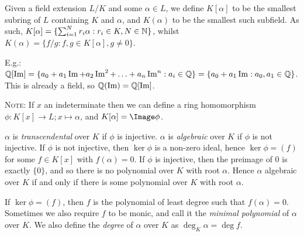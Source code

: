\documentclass[a4paper, 10pt, twocolumn]{amsart}
\begin{document}
Given a field extension $L/K$ and some $\alpha \in L$, we define $K[\alpha]$ to be the smallest subring of $L$ containing $K$ and $\alpha$, and $K(\alpha)$ to be the smallest such subfield. As such, $K[\alpha] = \{\sum_{i=1}^N r_i \alpha : r_i \in K, N \in \mathbb{N}\}$, whilst $K(\alpha) = \{f/g : f,g \in K[\alpha], g\neq 0\}$.

E.g.: $\mathbb{Q}[\operatorname{Im}] = \{a_0 + a_1\operatorname{Im} + a_2\operatorname{Im}^2 + \ldots + a_n\operatorname{Im}^n :a_i\in\mathbb{Q}\} = \{a_0 + a_1\operatorname{Im} : a_0, a_1 \in \mathbb{Q}\}$. This is already a field, so $\mathbb{Q}(\operatorname{Im}) = \mathbb{Q}[\operatorname{Im}]$.

\textsc{Note:} If $x$ an indeterminate then we can define a ring homomorphism $\phi:K[x] \rightarrow L; x\mapsto \alpha$, and $K[\alpha] = \Image \phi$.

$\alpha$ is \emph{transcendental} over $K$ if $\phi$ is injective. $\alpha$ is \emph{algebraic} over $K$ if $\phi$ is not injective. If $\phi$ is not injective, then $\ker\phi$ is a non-zero ideal, hence $\ker\phi = (f)$ for some $f\in K[x]$ with $f(\alpha) = 0$. If $\phi$ is injective, then the preimage of $0$ is exactly $\{0\}$, and so there is no polynomial over $K$ with root $\alpha$. Hence $\alpha$ algebraic over $K$ if and only if there is some polynomial over $K$ with root $\alpha$.

If $\ker \phi = (f)$, then $f$ is the polynomial of least degree such that $f(\alpha) = 0$. Sometimes we also require $f$ to be monic, and call it the \emph{minimal polynomial} of $\alpha$ over $K$. We also define the \emph{degree} of $\alpha$ over $K$ as $\deg_K \alpha = \deg f$.
\end{document}
